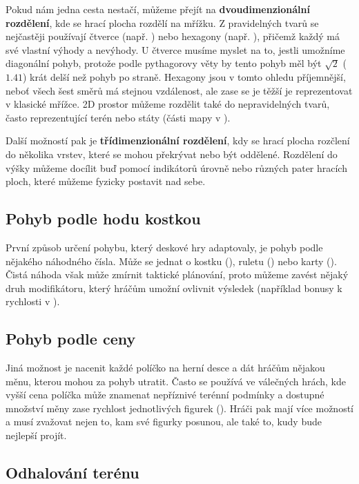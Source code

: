 Pokud nám jedna cesta nestačí, můžeme přejít na \textbf{dvoudimenzionální rozdělení}, kde se hrací plocha rozdělí na mřížku. Z pravidelných tvarů se nejčastěji používají čtverce (např. ) nebo hexagony (např. ), přičemž každý má své vlastní výhody a nevýhody. U čtverce musíme myslet na to, jestli umožníme diagonální pohyb, protože podle pythagorovy věty by tento pohyb měl být $\sqrt{2}$ ($1.41$) krát delší než pohyb po straně. Hexagony jsou v tomto ohledu příjemnější, neboť všech šest směrů má stejnou vzdálenost, ale zase se je těžší je reprezentovat v klasické mřížce. 2D prostor můžeme rozdělit také do nepravidelných tvarů, často reprezentující terén nebo státy (části mapy v ).

Další možností pak je \textbf{třídimenzionální rozdělení}, kdy se hrací plocha rozčlení do několika vrstev, které se mohou překrývat nebo být oddělené. Rozdělení do výšky můžeme docílit buď pomocí indikátorů úrovně nebo různých pater hracích ploch, které můžeme fyzicky postavit nad sebe.

\subsection{Pohyb podle hodu kostkou}
\label{subsec:movement_roll_movement}

První způsob určení pohybu, který deskové hry adaptovaly, je pohyb podle nějakého náhodného čísla. Může se jednat o kostku (), ruletu () nebo karty (). Čistá náhoda však může zmírnit taktické plánování, proto můžeme zavést nějaký druh modifikátoru, který hráčům umožní ovlivnit výsledek (například bonusy k rychlosti v ).

\subsection{Pohyb podle ceny}
\label{subsec:movement_cost_movement}

Jiná možnost je nacenit každé políčko na herní desce a dát hráčům nějakou měnu, kterou mohou za pohyb utratit. Často se používá ve válečných hrách, kde vyšší cena políčka může znamenat nepříznivé terénní podmínky a dostupné množství měny zase rychlost jednotlivých figurek (). Hráči pak mají více možností a musí zvažovat nejen to, kam své figurky posunou, ale také to, kudy bude nejlepší projít.

\subsection{Odhalování terénu}
\label{subsec:map_reveal}

